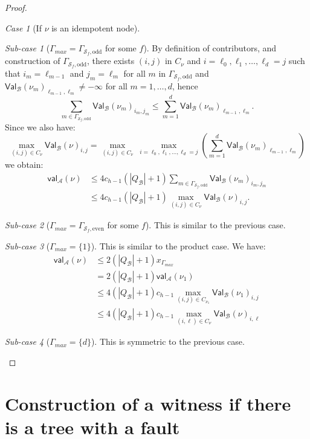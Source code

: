 \documentclass[10pt,a4paper]{amsart}
\theoremstyle{definition}
\numberwithin{equation}{section}
\theoremstyle{remark}
\newtheorem{case}{Case}
\newtheorem{subcase}{Sub-case}[case]
\newcommand{\autA}{\mathcal{A}}
\newcommand{\autB}{\mathcal{B}}
\newcommand{\aval}{\mathsf{val}_\autA}
\newcommand{\bval}{\mathsf{Val}_\autB}
\theoremstyle{remark}
\begin{document}
\begin{proof}
\begin{case}[If $\nu$ is an idempotent node]
\begin{subcase}[$\Gamma_{max} = \Gamma_{\mathcal{S}_f,\text{odd}}$ for some $f$]
By definition of contributors, and construction of $\Gamma_{\mathcal{S}_f,\text{odd}}$, there exists $(i,j)$ in $C_{\nu}$ and $i=\ell_0, \ell_1, \ldots, \ell_d=j$ such that $i_m = \ell_{m-1}$ and $j_m = \ell_{m}$ for all $m$ in $\Gamma_{\mathcal{S}_f,\text{odd}}$ and $\bval(\nu_m)_{\ell_{m-1},\ell_{m}} \neq -\infty$ for all $m=1,\ldots,d$, hence 
\[\sum_{m\in \Gamma_{\mathcal{S}_f,\text{odd}}}\bval(\nu_m)_{i_m,j_m} \leq \sum_{m=1}^{d}\bval(\nu_m)_{\ell_{m-1},\ell_{m}}.\]
Since we also have:
$$\max_{(i,j) \in C_{\nu}} \bval(\nu)_{i,j} = \max_{(i,j) \in C_{\nu}}\  \max_{i=\ell_0, \ell_1, \ldots, \ell_d=j}\left(\sum_{m=1}^{d}\bval(\nu_m)_{\ell_{m-1},\ell_{m}}\right)$$
we obtain:
\begin{align*}
\aval(\nu) &\le 4c_{h-1}(|Q_\autB| + 1)\sum_{m\in \Gamma_{\mathcal{S}_f,\text{odd}}}\bval(\nu_m)_{i_m,j_m}
\\&\le 4c_{h-1}(|Q_\autB| + 1)\max_{(i,j) \in C_{\nu}} \bval(\nu)_{i,j}.
\end{align*}
\end{subcase}

\begin{subcase}[$\Gamma_{max} = \Gamma_{\mathcal{S}_f,\text{even}}$ for some $f$]
This is similar to the previous case.
\end{subcase}

\begin{subcase}[$\Gamma_{max} = \{1\}$]
This is similar to the product case. We have:
\begin{align*}
\aval(\nu) &\le 2(|Q_\autB| + 1)x_{\Gamma_{max}}
\\&= 2(|Q_\autB| + 1)\aval(\nu_1)
\\&\le 4(|Q_\autB| + 1)c_{h-1} \max_{(i,j) \in C_{\nu_1}} \bval(\nu_1)_{i,j}
\\&\le 4(|Q_\autB| + 1)c_{h-1} \max_{(i,\ell) \in C_{\nu}} \bval(\nu)_{i,\ell}  \tag{by definition of contributors of the left-most child.}
\end{align*}
\end{subcase}

\begin{subcase}[$\Gamma_{max} = \{d\}$]
This is symmetric to the previous case.\qedhere
\end{subcase}
\end{case}
\end{proof}


\section{Construction of a witness if there is a tree with a fault}
\label{4implies3}
\end{document}
